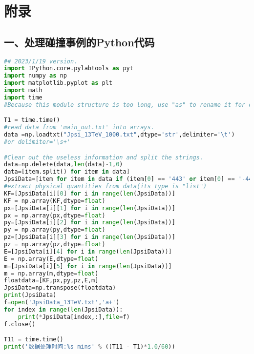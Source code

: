 \chapter{附录}

\section*{一、处理碰撞事例的Python代码}
\begin{lstlisting}[language={python}, basicstyle = \ttfamily,breaklines = true, caption={Python 源代码}, label=code_1]
## 2023/1/19 version.
import IPython.core.pylabtools as pyt 
import numpy as np
import matplotlib.pyplot as plt
import math
import time
#Because this module structure is too long, use "as" to rename it for conveniently invoking.

T1 = time.time()
#read data from 'main_out.txt' into arrays.
data =np.loadtxt("Jpsi_13TeV_1000.txt",dtype='str',delimiter='\t')
#or delimiter='\s+'

#Clear out the useless information and split the strings.
data=np.delete(data,len(data)-1,0)
data=[item.split() for item in data]
JpsiData=[item for item in data if (item[0] == '443' or item[0] == '-443')]
#extract physical quantities from data(its type is "list")
KF=[JpsiData[i][0] for i in range(len(JpsiData))]
KF = np.array(KF,dtype=float)
px=[JpsiData[i][1] for i in range(len(JpsiData))]
px = np.array(px,dtype=float)
py=[JpsiData[i][2] for i in range(len(JpsiData))]
py = np.array(py,dtype=float)
pz=[JpsiData[i][3] for i in range(len(JpsiData))]
pz = np.array(pz,dtype=float)
E=[JpsiData[i][4] for i in range(len(JpsiData))]
E = np.array(E,dtype=float)
m=[JpsiData[i][5] for i in range(len(JpsiData))]
m = np.array(m,dtype=float)
floatdata=[KF,px,py,pz,E,m]
JpsiData=np.transpose(floatdata)
print(JpsiData)
f=open('JpsiData_13TeV.txt','a+')
for index in range(len(JpsiData)):
    print(*JpsiData[index,:],file=f)
f.close()

T11 = time.time()
print('数据处理时间:%s mins' % ((T11 - T1)*1.0/60))
\end{lstlisting}
